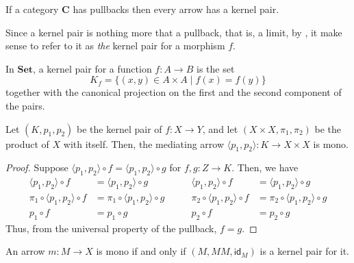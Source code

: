 \documentclass[runningheads,envcountsect]{lipics-v2021}
\newcommand{\cat}[1]{\ensuremath{\mathbf{#1}}}
\newcommand{\Set}{\mathbf{Set}}
\newcommand{\id}[1]{\mathsf{id}_{#1}}
\begin{document}
\begin{remark}
	If a category $\cat{C}$ has pullbacks then every arrow has a kernel pair.
\end{remark}

\begin{remark}
    Since a kernel pair is nothing more that a pullback, that is, a limit, by , it make sense to refer to it as \emph{the} kernel pair for a morphism $f$.
\end{remark}

\begin{example}\label{ex:kernel_pairs_in_Set}
    In $\Set$, a kernel pair for a function $f: A\to B$ is the set
    \[
        K_f=\{(x, y) \in A \times A \mid f(x) = f(y)\}
    \]
    together with the canonical projection on the first and the second component of the pairs.
\end{example}

\begin{proposition}\label{prop:pairng_of_kernel_pairs_mono}
    Let $(K, p_1, p_2)$ be the kernel pair of $f: X \to Y$, and let $(X\times X, \pi_1, \pi_2)$ be the product of $X$ with itself. Then, the mediating arrow $\langle p_1, p_2\rangle : K \to X \times X$ is mono.
\end{proposition}

\begin{proof}
	Suppose $\langle p_1, p_2 \rangle \circ f = \langle p_1, p_2 \rangle \circ g$ for $f, g: Z \to K$. Then, we have
	\[
		\begin{split}
			\langle p_1, p_2 \rangle \circ f &=  \langle p_1, p_2 \rangle \circ g \\
			\pi_1 \circ \langle p_1, p_2 \rangle \circ f &=  \pi_1 \circ \langle p_1, p_2 \rangle \circ g \\
			p_1 \circ f &= p_1 \circ g
		\end{split}
		\qquad
		\begin{split}
			\langle p_1, p_2 \rangle \circ f &=  \langle p_1, p_2 \rangle \circ g \\
			\pi_2 \circ \langle p_1, p_2 \rangle \circ f &=  \pi_2 \circ \langle p_1, p_2 \rangle \circ g \\
			p_2 \circ f &= p_2 \circ g
		\end{split}
	\]
	Thus, from the universal property of the pullback, $f = g$.   
\end{proof}

\begin{proposition}\label{prop:kermono}
	An arrow $m\colon M\to X$ is mono if and only if $(M, MM, \id{M})$ is a kernel pair for it.
\end{proposition}
\end{document}

